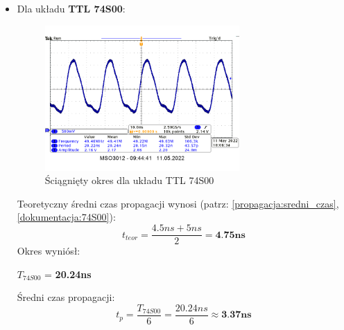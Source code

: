 \begin{itemize}
    \item Dla układu \textbf{TTL 74S00}:
        \begin{figure}[H]
            \centering
            \includegraphics[width=0.7\textwidth]{img/osciloscope/4_propagacja74S00.png}
            \caption{Ściągnięty okres dla układu TTL 74S00}
            \label{propagacja:okres_74S00}
        \end{figure}
        Teoretyczny średni czas propagacji wynosi (patrz: \ref{propagacja:sredni_czas}, \ref{dokumentacja:74S00}):
            \begin{equation}
                t_{teor} = \dfrac{4.5ns + 5ns}{2} = \textbf{4.75ns}
            \end{equation}
        Okres wyniósł:
            \begin{center}
                $T_{74S00}$ = \textbf{20.24ns}
            \end{center}
        Średni czas propagacji:
            \begin{equation}
                t_p = \dfrac{T_{74S00}}{6} = \dfrac{20.24ns}{6} \approx \textbf{3.37ns}
            \end{equation}
\end{itemize}